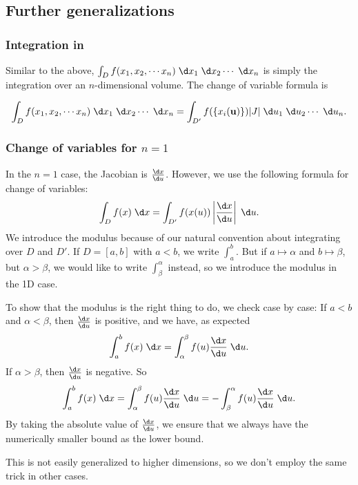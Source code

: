 \documentclass[a4paper]{article}
\begin{document}
\subsection{Further generalizations}
\subsubsection*{Integration in }
Similar to the above, $\int_D f(x_1, x_2, \cdots x_n)\;\d x_1 \;\d x_2\cdots\;\d x_n$ is simply the integration over an $n$-dimensional volume. The change of variable formula is
\begin{prop}
  \[
    \int_D f(x_1, x_2, \cdots x_n)\;\d x_1 \;\d x_2\cdots\;\d x_n = \int_{D'} f(\{x_i(\mathbf{u})\}) |J| \;\d u_1\;\d u_2\cdots\;\d u_n.
  \]
\end{prop}

\subsubsection*{Change of variables for \texorpdfstring{$n = 1$}{n = 1}}
In the $n = 1$ case, the Jacobian is $\frac{\d x}{\d u}$. However, we use the following formula for change of variables:
\[
  \int_D f(x) \;\d x = \int_{D'} f(x(u))\left|\frac{\d x}{\d u}\right| \;\d u.
\]
We introduce the modulus because of our natural convention about integrating over $D$ and $D'$. If $D = [a, b]$ with $a < b$, we write $\int_a^b$. But if $a\mapsto \alpha$ and $b \mapsto \beta$, but $\alpha > \beta$, we would like to write $\int_\beta ^\alpha$ instead, so we introduce the modulus in the 1D case.

To show that the modulus is the right thing to do, we check case by case: If $a < b$ and $\alpha < \beta$, then $\frac{\d x}{\d u}$ is positive, and we have, as expected
\[
  \int_a^b f(x)\;\d x = \int_\alpha^\beta f(u)\frac{\d x}{\d u}\;\d u.
\]
If $\alpha > \beta$, then $\frac{\d x}{\d u}$ is negative. So
\[
  \int_a^b f(x)\;\d x = \int_\alpha^\beta f(u)\frac{\d x}{\d u}\;\d u = -\int_\beta^\alpha f(u)\frac{\d x}{\d u}\;\d u.
\]
By taking the absolute value of $\frac{\d x}{\d u}$, we ensure that we always have the numerically smaller bound as the lower bound.

This is not easily generalized to higher dimensions, so we don't employ the same trick in other cases.
\end{document}

